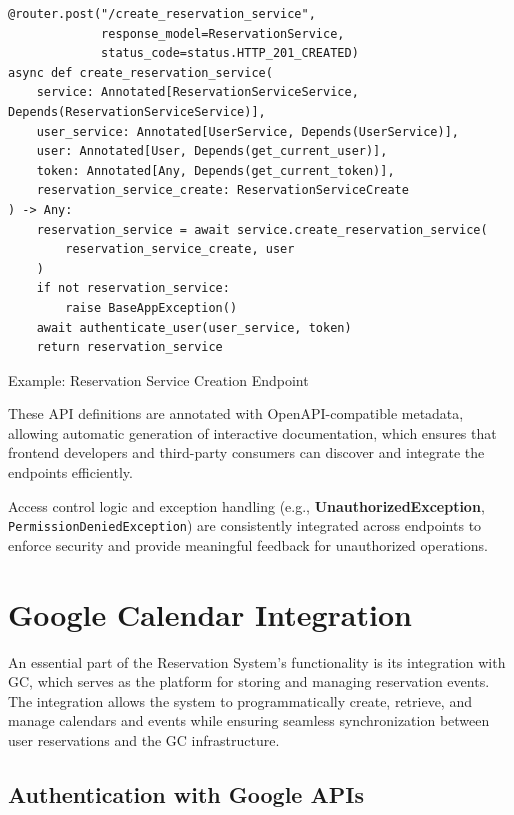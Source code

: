 \begin{listing}[t]
\begin{verbatim}
@router.post("/create_reservation_service",
             response_model=ReservationService,
             status_code=status.HTTP_201_CREATED)
async def create_reservation_service(
    service: Annotated[ReservationServiceService, Depends(ReservationServiceService)],
    user_service: Annotated[UserService, Depends(UserService)],
    user: Annotated[User, Depends(get_current_user)],
    token: Annotated[Any, Depends(get_current_token)],
    reservation_service_create: ReservationServiceCreate
) -> Any:
    reservation_service = await service.create_reservation_service(
        reservation_service_create, user
    )
    if not reservation_service:
        raise BaseAppException()
    await authenticate_user(user_service, token)
    return reservation_service
\end{verbatim}
\caption{Example: Reservation Service Creation Endpoint}
\label{list:create-reservation-service}
\end{listing}

These API definitions are annotated with OpenAPI-compatible metadata, allowing automatic generation of interactive documentation, which ensures that frontend developers and third-party consumers can discover and integrate the endpoints efficiently.

Access control logic and exception handling (e.g., \textbf{UnauthorizedException}, \texttt{PermissionDeniedException}) are consistently integrated across endpoints to enforce security and provide meaningful feedback for unauthorized operations.

\section{Google Calendar Integration}

An essential part of the Reservation System’s functionality is its integration with GC, which serves as the platform for storing and managing reservation events. The integration allows the system to programmatically create, retrieve, and manage calendars and events while ensuring seamless synchronization between user reservations and the GC infrastructure.

\subsection{Authentication with Google APIs}

